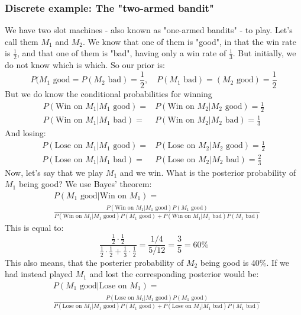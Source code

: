 \documentclass[12pt, a4paper]{article}
\begin{document}
\subsubsection{Discrete example: The "two-armed bandit"}
We have two slot machines - also known as "one-armed bandits" - to play. Let's call them $M_1$ and $M_2$. We know that one of them is "good", in that the win rate is $\frac{1}{2}$, and that one of them is "bad", having only a win rate of $\frac{1}{3}$. But initially, we do not know which is which. So our prior is:
\begin{equation}
P(M_1\textrm{ good}=P(M_2\textrm{ bad})=\frac{1}{2},\quad P(M_1\textrm{ bad})= (M_2\textrm{ good})=\frac{1}{2}
\end{equation}
But we do know the conditional probabilities for winning
\begin{align}
P(\textrm{Win on }M_1|M_1\textrm{ good})=&P(\textrm{Win on }M_2|M_2\textrm{ good})=\frac{1}{2}\\
P(\textrm{Win on }M_1|M_1\textrm{ bad})=&P(\textrm{Win on }M_2|M_2\textrm{ bad})=\frac{1}{3}
\end{align}
And losing:
\begin{align}
P(\textrm{Lose on }M_1|M_1\textrm{ good})=&P(\textrm{Lose on }M_2|M_2\textrm{ good})=\frac{1}{2}\\
P(\textrm{Lose on }M_1|M_1\textrm{ bad})=&P(\textrm{Lose on }M_2|M_2\textrm{ bad})=\frac{2}{3}
\end{align}
Now, let's say that we play $M_1$ and we win. What is the posterior probability of $M_1$ being good? We use Bayes' theorem:
\begin{align}
&P(M_1\textrm{ good}|\textrm{Win on }M_1)=\\
&\frac{P(\textrm{Win on }M_1|M_1\textrm{ good})P(M_1\textrm{ good})}{P(\textrm{Win on }M_1|M_1\textrm{ good})P(M_1\textrm{ good})+P(\textrm{Win on }M_1|M_1\textrm{ bad})P(M_1\textrm{ bad})}
\end{align}
This is equal to:
\begin{equation}
\frac{\frac{1}{2}\cdot\frac{1}{2}}{\frac{1}{2}\cdot\frac{1}{2}+\frac{1}{3}\cdot\frac{1}{2}}=\frac{1/4}{5/12}=\frac{3}{5}=60\%
\end{equation}
This also means, that the posterier probability of $M_2$ being good is 40\%. If we had instead played $M_1$ and lost the corresponding posterior would be:
\begin{align}
&P(M_1\textrm{ good}|\textrm{Lose on }M_1)=\\
&\frac{P(\textrm{Lose on }M_1|M_1\textrm{ good})P(M_1\textrm{ good})}{P(\textrm{Lose on }M_1|M_1\textrm{ good})P(M_1\textrm{ good})+P(\textrm{Lose on }M_1|M_1\textrm{ bad})P(M_1\textrm{ bad})}
\end{align}
\end{document}
